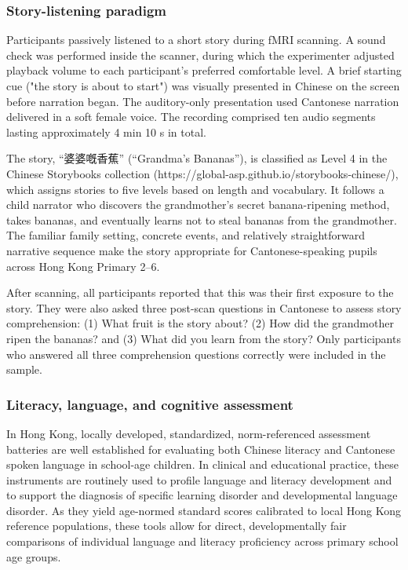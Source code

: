 \subsubsection{Story-listening paradigm}
Participants passively listened to a short story during fMRI scanning. A sound check was performed inside the scanner, during which the experimenter adjusted playback volume to each participant’s preferred comfortable level. A brief starting cue ("the story is about to start") was visually presented in Chinese on the screen before narration began.  The auditory-only presentation used Cantonese narration delivered in a soft female voice. The recording comprised ten audio segments lasting approximately 4 min 10 s in total.

The story, ``婆婆嘅香蕉'' (``Grandma's Bananas''), is classified as Level 4 in the Chinese Storybooks collection (https://global-asp.github.io/storybooks-chinese/), which assigns stories to five levels based on length and vocabulary. It follows a child narrator who discovers the grandmother’s secret banana-ripening method, takes bananas, and eventually learns not to steal bananas from the grandmother. The familiar family setting, concrete events, and relatively straightforward narrative sequence make the story appropriate for Cantonese-speaking pupils across Hong Kong Primary 2–6.

After scanning, all participants reported that this was their first exposure to the story. They were also asked three post-scan questions in Cantonese to assess story comprehension: (1) What fruit is the story about? (2) How did the grandmother ripen the bananas? and (3) What did you learn from the story? Only participants who answered all three comprehension questions correctly were included in the sample.

\subsubsection{Literacy, language, and cognitive assessment}
In Hong Kong, locally developed, standardized, norm-referenced assessment batteries are well established for evaluating both Chinese literacy \cite{ho2015hong} and Cantonese spoken language \cite{t2006hong} in school-age children. In clinical and educational practice, these instruments are routinely used to profile language and literacy development and to support the diagnosis of specific learning disorder and developmental language disorder. As they yield age-normed standard scores calibrated to local Hong Kong reference populations, these tools allow for direct, developmentally fair comparisons of individual language and literacy proficiency across primary school age groups.

